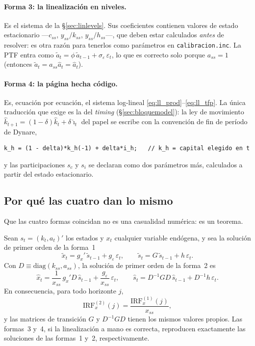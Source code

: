 \documentclass[11pt,a4paper]{report}
\newcounter{tcbprop}[section]
\renewcommand{\thetcbprop}{\thesection.\arabic{tcbprop}}
\newenvironment{proposition}[1][]{%
  \refstepcounter{tcbprop}%
  \begin{tcolorbox}[propstyle, title={Proposición~\thetcbprop%
    \ifx\relax#1\relax\else\ (#1)\fi}]}%
{\end{tcolorbox}}
\newcommand{\code}[1]{\texttt{#1}}
\begin{document}
\paragraph{Forma 3: la linealización en niveles.} Es el sistema de la
\S\ref{sec:linlevels}. Sus coeficientes contienen valores de estado estacionario
---$c_{ss}$, $y_{ss}/k_{ss}$, $y_{ss}/h_{ss}$---, que deben estar calculados
\emph{antes} de resolver: es otra razón para tenerlos como parámetros en
\code{calibracion.inc}. La PTF entra como $\tilde{a}_t=\phi\,\tilde{a}_{t-1}+
\sigma_\varepsilon\,\varepsilon_t$, lo que es correcto solo porque $a_{ss}=1$
(entonces $\tilde{a}_t=a_{ss}\hat{a}_t=\hat{a}_t$).

\paragraph{Forma 4: la página hecha código.} Es, ecuación por ecuación, el sistema
log-lineal \eqref{eq:ll_prod}--\eqref{eq:ll_tfp}. La única traducción que exige es la
del \emph{timing} (\S\ref{sec:bloquemodel}): la ley de movimiento
$\hat{k}_{t+1}=(1-\delta)\hat{k}_t+\delta\hat{\imath}_t$ del papel se escribe con la
convención de fin de período de Dynare,
\begin{lstlisting}[numbers=none]
k_h = (1 - delta)*k_h(-1) + delta*i_h;   // k_h = capital elegido en t
\end{lstlisting}
y las participaciones $s_c$ y $s_i$ se declaran como dos parámetros más, calculados a
partir del estado estacionario.

\subsection{Por qué las cuatro dan lo mismo}

Que las cuatro formas coincidan no es una casualidad numérica: es un teorema.

\begin{proposition}[Equivalencia a primer orden]
\label{prop:cuatroformas}
Sean $s_t=(k_t,a_t)'$ los estados y $x_t$ cualquier variable endógena, y sea la
solución de primer orden de la forma~1
\[
\tilde{x}_t=g_x'\,\tilde{s}_{t-1}+g_\varepsilon\,\varepsilon_t,\qquad
\tilde{s}_t=G\,\tilde{s}_{t-1}+h\,\varepsilon_t .
\]
Con $D\equiv\mathrm{diag}(k_{ss},a_{ss})$, la solución de primer orden de la forma~2 es
\[
\hat{x}_t=\frac{1}{x_{ss}}\,g_x'D\,\hat{s}_{t-1}+\frac{g_\varepsilon}{x_{ss}}\,\varepsilon_t,
\qquad
\hat{s}_t=D^{-1}GD\,\hat{s}_{t-1}+D^{-1}h\,\varepsilon_t .
\]
En consecuencia, para todo horizonte $j$,
\begin{equation}
\mathrm{IRF}^{(2)}_x(j)=\frac{\mathrm{IRF}^{(1)}_x(j)}{x_{ss}},
\label{eq:irf12}
\end{equation}
y las matrices de transición $G$ y $D^{-1}GD$ tienen los mismos valores propios. Las
formas~3 y~4, si la linealización a mano es correcta, reproducen exactamente las
soluciones de las formas~1 y~2, respectivamente.
\end{proposition}
\end{document}
